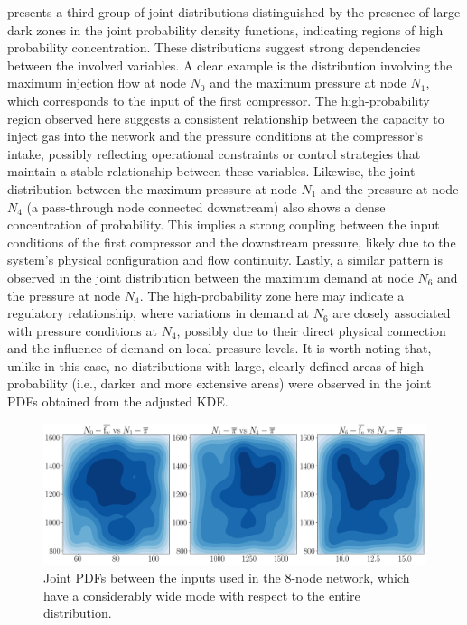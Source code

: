  presents a third group of joint distributions distinguished by the presence of large dark zones in the joint probability density functions, indicating regions of high probability concentration. These distributions suggest strong dependencies between the involved variables. A clear example is the distribution involving the maximum injection flow at node $N_0$ and the maximum pressure at node $N_1$, which corresponds to the input of the first compressor. The high-probability region observed here suggests a consistent relationship between the capacity to inject gas into the network and the pressure conditions at the compressor’s intake, possibly reflecting operational constraints or control strategies that maintain a stable relationship between these variables. Likewise, the joint distribution between the maximum pressure at node $N_1$ and the pressure at node $N_4$ (a pass-through node connected downstream) also shows a dense concentration of probability. This implies a strong coupling between the input conditions of the first compressor and the downstream pressure, likely due to the system’s physical configuration and flow continuity. Lastly, a similar pattern is observed in the joint distribution between the maximum demand at node $N_6$ and the pressure at node $N_4$. The high-probability zone here may indicate a regulatory relationship, where variations in demand at $N_6$ are closely associated with pressure conditions at $N_4$, possibly due to their direct physical connection and the influence of demand on local pressure levels. It is worth noting that, unlike in this case, no distributions with large, clearly defined areas of high probability (i.e., darker and more extensive areas) were observed in the joint PDFs obtained from the adjusted KDE.


\begin{figure}[htbp]
    \centering
    \includegraphics[width=.8\textwidth]{figures/Chapter_NonLinealCensnet/PDF_inputs_inputs_wide_mode.png}
    \caption{Joint PDFs between the inputs used in the 8-node network, which have a considerably wide mode with respect to the entire distribution.}
    \label{fig:joint_distributions_input_input_wide_mode}
\end{figure}


